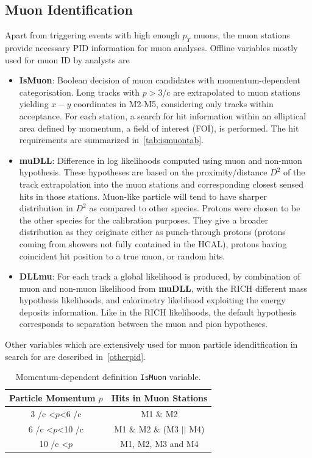 \subsection{Muon Identification }
\label{muonID}
Apart from triggering events with high enough $p_{T}$ muons, the muon stations provide necessary PID information for muon analyses. Offline variables mostly used for muon ID by analysts are
\begin{itemize}
	\item{\textbf{IsMuon}: Boolean decision of muon candidates with momentum-dependent categorisation. Long tracks with $p>3$\gev/c are extrapolated to muon stations yielding $x-y$ coordinates in M2-M5, considering only tracks within acceptance. For each station, a search for hit information within an elliptical area defined by momentum, a field of interest (\Gls{FOI}), is performed. The hit requirements are summarized in~\autoref{tab:ismuontab}.}
	\item{\textbf{muDLL}: Difference in log likelihoods computed using muon and non-muon hypothesis. These hypotheses are based on the proximity/distance $D^{2}$ of the track extrapolation into the muon stations and corresponding closest sensed hits in those stations. Muon-like particle will tend to have sharper distribution in $D^{2}$ as compared to other species. Protons were chosen to be the other species for the calibration purposes. They give a broader distribution as they originate either as punch-through protons (protons coming from showers not fully contained in the \gls{HCAL}), protons having coincident hit position to a true muon, or random hits.}
	\item{\textbf{DLLmu}}:  For each track a global likelihood is produced, by combination of muon and non-muon likelihood from \textbf{muDLL}, with the \Gls{RICH} different mass hypothesis likelihoods, and calorimetry likelihood exploiting the energy deposits information. Like in the \Gls{RICH} likelihoods, the default hypothesis corresponds to separation between the muon and pion hypotheses.    

\end{itemize}

\noindent Other variables which are extensively used for muon particle idenditfication in search for \Bmumumu are described in~\autoref{otherpid}. 

\begin{table}[!h]
	\centering
	\hspace*{-0.8cm}
	\begin{tabular}{c c}
		\toprule
		Particle Momentum $p$  & Hits in Muon Stations \\ \hline
		3 \gev/c <$p$<6 \gev/c & M1 $\&$ M2\\
		6 \gev/c <$p$<10 \gev/c & M1 $\&$ M2 $\&$ (M3 $||$ M4) \\
		10 \gev/c <$p$ & M1, M2, M3 and M4 \\ \bottomrule      
	\end{tabular}
	\caption{Momentum-dependent definition \texttt{IsMuon} variable.}
	\label{tab:ismuontab}
\end{table}   

